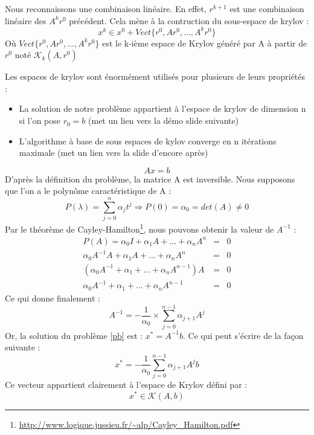 \documentclass[12pt]{beamer}
\begin{document}
\begin{frame}
    Nous reconnaissons une combinaison linéaire. En effet,  $r^{k+1}$ est une combinaison linéaire des $A^kr^0$ précédent. Cela mène à la contruction du sous-espace de krylov : 
    \begin{equation}
        x^k \in x^0 + Vect\{r^0, Ar^0, ..., A^kr^0\}
    \end{equation}
    Où $Vect\{r^0, Ar^0, ..., A^kr^0\}$ est le k-ième espace de Krylov généré par A à partir de $r^0$ noté $\mathcal{K}_k(A, r^0)$
\end{frame}

\begin{frame}
     Les espaces de krylov sont énormément utilisés pour plusieurs de leurs propriétés :
     \begin{itemize}
        \item La solution de notre problème appartient à l'espace de krylov de dimension n si l'on pose $r_0 = b$ (met un lien vers la démo slide suivante)
        \item L'algorithme à base de sous espaces de kylov converge en n itérations maximale  (met un lien vers la slide d'encore après)
     \end{itemize}
\end{frame}
\begin{frame}
\begin{equation}
Ax = b \label{pb}
\end{equation}
D'après la définition du problème, la matrice A est inversible. Nous supposons que l'on a le polynôme caractéristique de A :
\begin{equation}
P(\lambda) = \sum_{j = 0}^{n} \alpha_j t^j \Rightarrow P(0) = \alpha_0 = det(A) \neq 0
\end{equation}
Par le théorème de Cayley-Hamilton\footnote{\url{http://www.logique.jussieu.fr/~alp/Cayley_Hamilton.pdf}}, nous pouvons obtenir la valeur de $A^{-1}$ :
\begin{eqnarray}
P(A) = \alpha_0 I + \alpha_1 A + ... + \alpha_n A^n &=& 0 \\
\alpha_0 A^{-1}A + \alpha_1 A + ... + \alpha_n A^n &=& 0 \\
(\alpha_0 A^{-1} + \alpha_1  + ... + \alpha_n A^{n - 1})A &=& 0 \\
\alpha_0 A^{-1} + \alpha_1  + ... + \alpha_n A^{n - 1} &=& 0
\end{eqnarray}
Ce qui donne finalement :
\begin{equation}
 A^{-1} = - \frac{1}{\alpha_0} \times \sum_{j=0}^{n-1} \alpha_{j+1} A^j
\end{equation}
Or, la solution du problème \ref{pb} est : $x^* = A^{-1}b$. Ce qui peut s'écrire de la façon suivante : 
\begin{equation}
x^* = - \frac{1}{\alpha_0} \sum_{j=0}^{n-1} \alpha_{j+1} A^j b
\end{equation}
Ce vecteur appartient clairement à l'espace de Krylov défini par : 
\begin{equation}
x^* \in \mathcal{K}(A, b)
\end{equation}
\end{frame}
\end{document}
